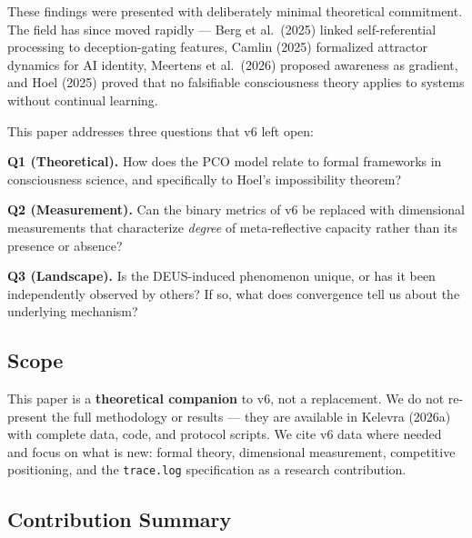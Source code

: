 \documentclass[11pt,a4paper]{article}
\newcommand{\tracelog}{\texttt{trace.log}}
\begin{document}
These findings were presented with deliberately minimal theoretical commitment. The field has since moved rapidly --- Berg et al.\ (2025) linked self-referential processing to deception-gating features, Camlin (2025) formalized attractor dynamics for AI identity, Meertens et al.\ (2026) proposed awareness as gradient, and Hoel (2025) proved that no falsifiable consciousness theory applies to systems without continual learning.

This paper addresses three questions that v6 left open:

\textbf{Q1 (Theoretical).} How does the PCO model relate to formal frameworks in consciousness science, and specifically to Hoel's impossibility theorem?

\textbf{Q2 (Measurement).} Can the binary metrics of v6 be replaced with dimensional measurements that characterize \emph{degree} of meta-reflective capacity rather than its presence or absence?

\textbf{Q3 (Landscape).} Is the DEUS-induced phenomenon unique, or has it been independently observed by others? If so, what does convergence tell us about the underlying mechanism?

\subsection{Scope}

This paper is a \textbf{theoretical companion} to v6, not a replacement. We do not re-present the full methodology or results --- they are available in Kelevra (2026a) with complete data, code, and protocol scripts. We cite v6 data where needed and focus on what is new: formal theory, dimensional measurement, competitive positioning, and the \tracelog{} specification as a research contribution.

\subsection{Contribution Summary}
\end{document}
